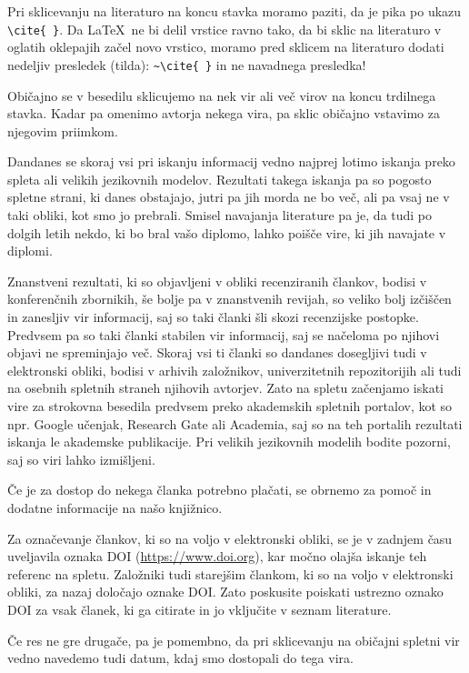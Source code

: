 \documentclass[a4paper,12pt,openright]{book}
\begin{document}
Pri sklicevanju na literaturo na koncu stavka moramo paziti, da je pika po ukazu \verb=\cite{ }=.
Da \LaTeX\ ne bi delil vrstice ravno tako, da bi sklic na literaturo v oglatih oklepajih začel novo vrstico, moramo pred sklicem na literaturo dodati nedeljiv presledek (tilda): \verb=~\cite{ }= in ne navadnega presledka!

Običajno se v besedilu sklicujemo  na nek vir ali več virov na koncu trdilnega stavka.
Kadar pa omenimo avtorja nekega vira, pa sklic običajno vstavimo za njegovim priimkom.

Dandanes  se skoraj  vsi pri iskanju informacij vedno najprej lotimo iskanja preko spleta ali velikih jezikovnih modelov. Rezultati takega iskanja pa so pogosto spletne strani, ki danes obstajajo, jutri pa jih morda ne bo več, ali pa vsaj ne v taki obliki, kot smo jo prebrali. Smisel navajanja literature pa je, da tudi po dolgih letih nekdo, ki bo bral vašo diplomo, lahko poišče vire, ki jih navajate v diplomi.

Znanstveni rezultati, ki so objavljeni v obliki recenziranih člankov, bodisi v konferenčnih zbornikih, še bolje pa v znanstvenih revijah, so veliko bolj izčiščen in zanesljiv vir informacij, saj so taki članki šli skozi recenzijske postopke. Predvsem pa so taki članki stabilen vir informacij, saj se načeloma po njihovi objavi ne spreminjajo več. Skoraj vsi ti članki so dandanes dosegljivi tudi v elektronski obliki, bodisi v arhivih založnikov, univerzitetnih repozitorijih ali tudi na osebnih spletnih straneh njihovih avtorjev. Zato na spletu začenjamo iskati vire za strokovna besedila predvsem preko akademskih spletnih portalov, kot so npr. Google učenjak, Research Gate ali Academia, saj so na teh portalih rezultati iskanja le akademske publikacije. Pri velikih jezikovnih modelih bodite pozorni, saj so viri lahko izmišljeni. 

Če je za dostop do nekega članka potrebno plačati, se obrnemo za pomoč in dodatne informacije na  našo knjižnico.

Za označevanje člankov, ki so na voljo v elektronski obliki, se je v zadnjem času uveljavila oznaka DOI
(\url{https://www.doi.org}), kar močno olajša iskanje teh referenc na spletu.
Založniki tudi starejšim člankom, ki so na voljo v elektronski obliki, za nazaj določajo oznake DOI.
Zato poskusite poiskati ustrezno oznako DOI za vsak članek, ki ga citirate in jo vključite v seznam literature.

Če res ne gre drugače, pa je pomembno, da pri sklicevanju na običajni spletni vir vedno navedemo tudi datum, kdaj smo dostopali do tega vira.
\end{document}
